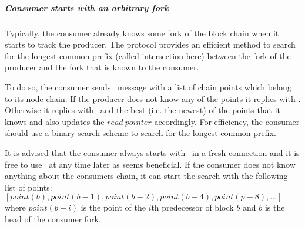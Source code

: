 \documentclass{report}
\newcommand{\wip}[1]{\color{magenta}{#1}\color{black}}
\renewcommand{\langle}{[}
\renewcommand{\rangle}{]}
\theoremstyle{definition}{
  \newtheorem{lemma}{Lemma}[section] %
  \newtheorem{definition}[lemma]{Definition}
}
\theoremstyle{theorem}{
  \newtheorem{invariant}[lemma]{Invariant}
  \newtheorem{proofobligation}[lemma]{Proof Obligation}
}
\numberwithin{equation}{lemma}
\begin{document}
\subparagraph{Consumer starts with an arbitrary fork}
Typically, the consumer already knows some fork of the block chain when it
starts to track the producer.
The protocol provides an efficient method to search for the longest common prefix (called intersection here)
between the fork of the producer and the fork that is known to the consumer.

To do so, the consumer sends \FindIntersect~message with a list of chain
points which belong to its node chain.
If the producer does not know any of the points it replies with \IntersectUnchanged.
Otherwise it replies with \IntersectImproved~and the best (i.e. the newest) of the points that it knows
and also updates the $read~pointer$ accordingly.
For efficiency, the consumer should use a binary search scheme to search for the longest common
prefix.

It is advised that the consumer always starts with \FindIntersect~in a fresh connection
and it is free to use \FindIntersect~at any time later as seems beneficial.
If the consumer does not know anything about the consumers chain,
it can start the search with the following list of points:
$\langle point(b), point(b-1), point(b-2), point(b-4), point (p-8),\ldots \rangle$
where $point(b-i)$ is the point of the $i$th predecessor of block $b$ and
$b$ is the head of the consumer fork.
\wip{(Note, that the maximum depth of a fork in Ouroboros is bounded).}
\end{document}
